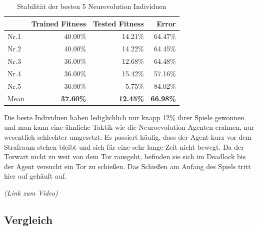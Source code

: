                \begin{table}[H]
                    \begin{center}
                    \begin{tabular}{ |l|r|r|r| } 
                        \hline
                        \hfill & Trained Fitness   & Tested Fitness  &          Error    \\ \hline
                          Nr.1 &          40.00\%  &         14.21\% &          64.47\%  \\  
                          Nr.2 &          40.00\%  &         14.22\% &          64.45\%  \\  
                          Nr.3 &          36.00\%  &         12.68\% &          64.48\%  \\ 
                          Nr.4 &          36.00\%  &         15.42\% &          57.16\%  \\ 
                          Nr.5 &          36.00\%  &          5.75\% &          84.02\%  \\ \hline
                          Mean &  \textbf{37.60\%} & \textbf{12.45\%} & \textbf{66.98\%}  \\ \hline
                    \end{tabular}
                    \end{center}
                    \caption{Stabilität der besten 5 Neurevolution Individuen \label{fig:neuroevotable}}
                \end{table}
                \noindent
                Die beste Individuen haben lediglichlich nur knapp 12\% ihrer Spiele gewonnen und man kann eine ähnliche Taktik wie die Neuroevolution Agenten erahnen, nur wesentlich schlechter umgesetzt. Es passiert häufig, dass der Agent kurz vor dem Strafraum stehen bleibt und sich für eine sehr lange Zeit nicht bewegt. Da der Torwart nicht zu weit von dem Tor rausgeht, befinden sie sich im Deadlock bis der Agent versucht ein Tor zu schießen. Das Schießen am Anfang des Spiels tritt hier auf gehäuft auf.

                \begin{center} \textit{(Link zum Video)} \end{center}
\newpage
        \subsection{Vergleich}

